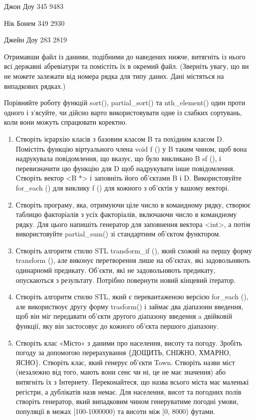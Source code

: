 \documentclass[]{article}
\begin{document}
\begin{enumerate}
Джон Доу 345 9483

Нік Бонем 349 2930

Джейн Доу 283 2819

Отримавши файл із даними, подібними до наведених нижче, витягніть із
нього всі державні абревіатури та помістіть їх в окремий файл. (Зверніть
увагу, що ви не можете залежати від номера рядка для типу даних. Дані
містяться на випадкових рядках.)

Порівняйте роботу функцій sort(), partial\_sort() та nth\_element() один
проти одного і з'ясуйте, чи дійсно варто використовувати одне із слабких
сортувань, коли вони можуть спрацювати коректно.


\begin{enumerate}
\def\labelenumi{\arabic{enumi}.}
\item
  Створіть ієрархію класів з базовим класом B та похідним класом D.
  Помістіть функцію віртуального члена void f () у B таким чином, щоб
  вона надрукувала повідомлення, що вказує, що було викликано B sf (), і
  перевизначити цю функцію для D щоб надрукувати інше повідомлення.
  Створіть вектор \textless{}B *\textgreater{} і заповніть його
  об'єктами B і D. Використовуйте for\_each () для виклику f () для
  кожного з об'єктів у вашому векторі.
\item
  Створіть програму, яка, отримуючи ціле число в командному рядку,
  створює таблицю факторіалів з усіх факторіалів, включаючи число в
  командному рядку. Для цього напишіть генератор для заповнення вектора
  \textless{}int\textgreater{}, а потім використовуйте partial\_sum() зі
  стандартним об'єктом функтором.
\item
  Створіть алгоритм стилю STL transform\_if (), який схожий на першу
  форму transform (), але виконує перетворення лише на об'єктах, які
  задовольняють одинарномй предикату. Об'єкти, які не задовольняють
  предикату, опускаються з результату. Потрібно повернути новий кінцевий
  ітератор.
\item
  Створіть алгоритм стилю STL, який є перевантаженою версією for\_each
  (), але використвоує другу форму trasform() і займає два діапазони
  введення, щоб він міг передавати об'єкти другого діапазону введення a
  двійковій функції, яку він застосовує до кожного об'єкта першого
  діапазону.
\item
  Створіть клас «Місто» з даними про населення, висоту та погоду.
  Зробіть погоду за допомогою перерахування \{ДОЩИТЬ, СНІЖНО, ХМАРНО,
  ЯСНО\}. Створіть клас, який генерує об'єкти Town. Створіть назви міст
  (незалежно від того, мають вони сенс чи ні, це не має значення) або
  витягніть їх з Інтернету. Переконайтеся, що назва всього міста має
  маленькі регістри, а дублікатів назв немає. Для населення, висот та
  погодних полів створіть генератор, який випадковим чином генеруватиме
  погодні умови, популяції в межах {[}100-1000000) та висоти між {[}0,
  8000) футами.


\end{enumerate}
\end{enumerate}
\end{document}
